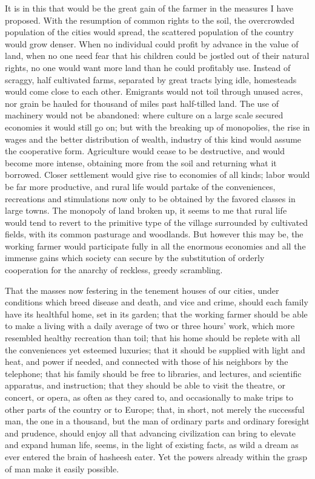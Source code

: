 \documentclass{book}
\begin{document}
It is in this that would be the great gain of the farmer in the measures I have proposed. With the resumption of common rights to the soil, the overcrowded population of the cities would spread, the scattered population of the country would grow denser. When no individual could profit by advance in the value of land, when no one need fear that his children could be jostled out of their natural rights, no one would want more land than he could profitably use. Instead of scraggy, half cultivated farms, separated by great tracts lying idle, homesteads would come close to each other. Emigrants would not toil through unused acres, nor grain be hauled for thousand of miles past half-tilled land. The use of machinery would not be abandoned: where culture on a large scale secured economies it would still go on; but with the breaking up of monopolies, the rise in wages and the better distribution of wealth, industry of this kind would assume the cooperative form. Agriculture would cease to be destructive, and would become more intense, obtaining more from the soil and returning what it borrowed. Closer settlement would give rise to economies of all kinds; labor would be far more productive, and rural life would partake of the conveniences, recreations and stimulations now only to be obtained by the favored classes in large towns. The monopoly of land broken up, it seems to me that rural life would tend to revert to the primitive type of the village surrounded by cultivated fields, with its common pasturage and woodlands. But however this may be, the working farmer would participate fully in all the enormous economies and all the immense gains which society can secure by the substitution of orderly cooperation for the anarchy of reckless, greedy scrambling.

That the masses now festering in the tenement houses of our cities, under conditions which breed disease and death, and vice and crime, should each family have its healthful home, set in its garden; that the working farmer should be able to make a living with a daily average of two or three hours’ work, which more resembled healthy recreation than toil; that his home should be replete with all the conveniences yet esteemed luxuries; that it should be supplied with light and heat, and power if needed, and connected with those of his neighbors by the telephone; that his family should be free to libraries, and lectures, and scientific apparatus, and instruction; that they should be able to visit the theatre, or concert, or opera, as often as they cared to, and occasionally to make trips to other parts of the country or to Europe; that, in short, not merely the successful man, the one in a thousand, but the man of ordinary parts and ordinary foresight and prudence, should enjoy all that advancing civilization can bring to elevate and expand human life, seems, in the light of existing facts, as wild a dream as ever entered the brain of hasheesh eater. Yet the powers already within the grasp of man make it easily possible.
\end{document}
